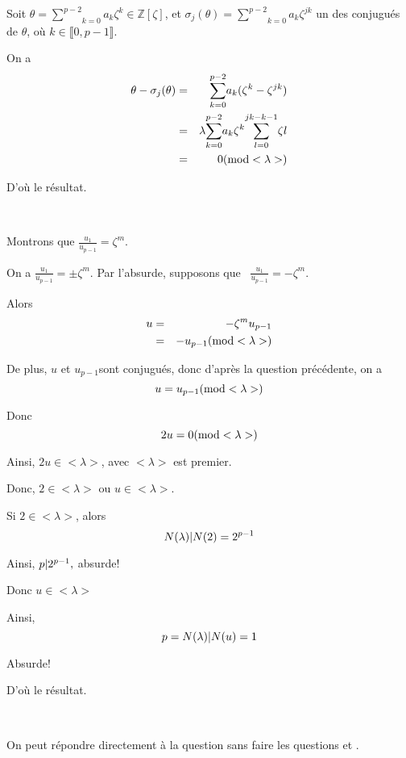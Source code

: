 Soit $\theta = \underset{k = 0}{\overset{p - 2}{\sum}} a_k \zeta^k \in
\mathbb{Z} [\zeta]$, et $\sigma_j (\theta) = \underset{k = 0}{\overset{p -
2}{\sum}} a_k \zeta^{j k}$ un des conjugu{\'e}s de $\theta$, o{\`u} $k \in
\llbracket 0, p - 1 \rrbracket$.

On a
\begin{eqnarray*}
  \theta - \sigma_j (\theta) & = & \underset{k = 0}{\overset{p - 2}{\sum}} a_k
  (\zeta^k - \zeta^{j k})\\
  & = & \lambda \underset{k = 0}{\overset{p - 2}{\sum}} a_k \zeta^k
  \underset{l = 0}{\overset{j k - k - 1}{\sum}} \zeta l\\
  & = & 0 (\operatorname{mod} < \lambda >)
\end{eqnarray*}


D'o{\`u} le r{\'e}sultat.

\

 Montrons que $\frac{u_1}{u_{p - 1}} = \zeta^m$.

On a  $\frac{u_1}{u_{p - 1}} = \pm \zeta^m$. Par l'absurde, supposons que \
$\frac{u_1}{u_{p - 1}} = - \zeta^m .$

Alors
\begin{eqnarray*}
  u & = & - \zeta^m u_{p - 1}\\
  & = & - u_{p - 1} (\operatorname{mod} < \lambda >)
\end{eqnarray*}


De plus, $u$ et $u_{p - 1} $sont conjugu{\'e}s, donc d'apr{\`e}s la question
pr{\'e}c{\'e}dente, on a
\[ u = u_{p - 1} (\operatorname{mod} < \lambda >) \]


Donc
\[ 2 u = 0 (\operatorname{mod} < \lambda >) \]


Ainsi, $2 u \in < \lambda >$, avec $< \lambda >$ est premier.

Donc, $2 \in < \lambda >$ ou $u \in < \lambda >$.

Si $2 \in < \lambda >$, alors
\[ N (\lambda) |  N (2) = 2^{p - 1} \]


Ainsi, $p | 2^{p - 1} ,$ absurde!

Donc $u \in < \lambda >$

Ainsi,
\[ p = N (\lambda) | N  (u) = 1 \]


Absurde!

D'o{\`u} le r{\'e}sultat.

\


On peut r{\'e}pondre directement {\`a} la question  sans
faire les questions \tmtextbf{6.c, 6.d} et \tmtextbf{6.e.i}.

